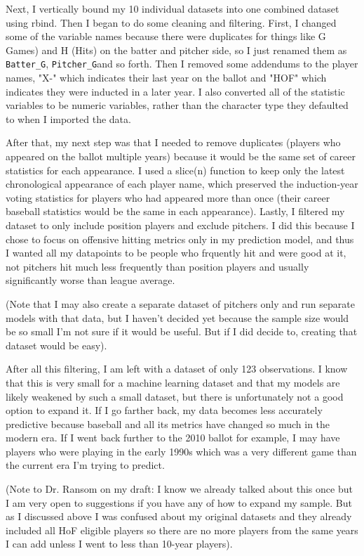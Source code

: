 \documentclass[12pt]{article}
\begin{document}
Next, I vertically bound my 10 individual datasets into one combined dataset using rbind. Then I began to do some cleaning and filtering. First, I changed some of the variable names because there were duplicates for things like G Games) and H (Hits) on the batter and pitcher side, so I just renamed them as \verb|Batter_G|, \verb|Pitcher_G|and so forth. Then I removed some addendums to the player names, "X-" which indicates their last year on the ballot and "HOF" which indicates they were inducted in a later year. I also converted all of the statistic variables to be numeric variables, rather than the character type they defaulted to when I imported the data. 

After that, my next step was that I needed to remove duplicates (players who appeared on the ballot multiple years) because it would be the same set of career statistics for each appearance. I used a slice(n) function to keep only the latest chronological appearance of each player name, which preserved the induction-year voting statistics for players who had appeared more than once (their career baseball statistics would be the same in each appearance). Lastly, I filtered my dataset to only include position players and exclude pitchers. I did this because I chose to focus on offensive hitting metrics only in my prediction model, and thus I wanted all my datapoints to be people who frquently hit and were good at it, not pitchers hit much less frequently than position players and usually significantly worse than league average. 

(Note that I may also create a separate dataset of pitchers only and run separate models with that data, but I haven't decided yet because the sample size would be so small I'm not sure if it would be useful. But if I did decide to, creating that dataset would be easy).

After all this filtering, I am left with a dataset of only 123 observations. I know that this is very small for a machine learning dataset and that my models are likely weakened by such a small dataset, but there is unfortunately not a good option to expand it. If I go farther back, my data becomes less accurately predictive because baseball and all its metrics have changed so much in the modern era. If I went back further to the 2010 ballot for example, I may have players who were playing in the early 1990s which was a very different game than the current era I'm trying to predict.

(Note to Dr. Ransom on my draft: I know we already talked about this once but I am very open to suggestions if you have any of how to expand my sample. But as I discussed above I was confused about my original datasets and they already included all HoF eligible players so there are no more players from the same years I can add unless I went to less than 10-year players).
\end{document}
